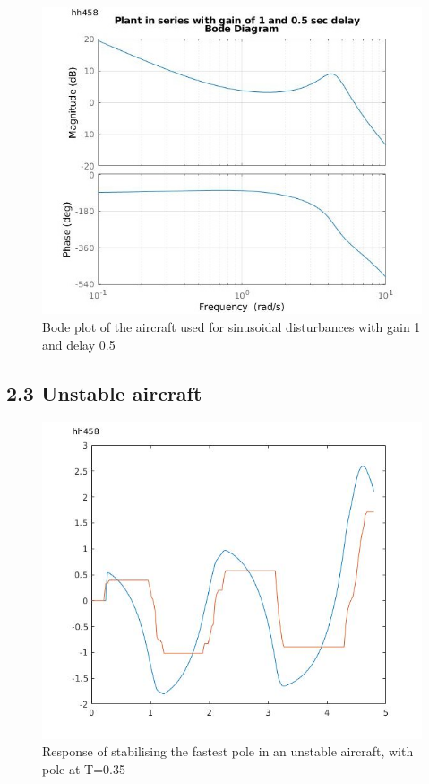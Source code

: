 \documentclass[twoside,twocolumn]{article}
\begin{document}
\begin{figure}[h]
  \centering
    \includegraphics[width=\linewidth]{2-2_bode}
  \caption{Bode plot of the aircraft used for sinusoidal disturbances with gain 1 and delay 0.5}
  \label{fig:2-2bode}
\end{figure}
\subsection{2.3 Unstable aircraft}
\begin{figure}[h]
  \centering
    \includegraphics[width=\linewidth]{2-3_T=0-35}
  \caption{Response of stabilising the fastest pole in an unstable aircraft, with pole at T=0.35}
  \label{fig:2-3fastest}
\end{figure}
\end{document}
